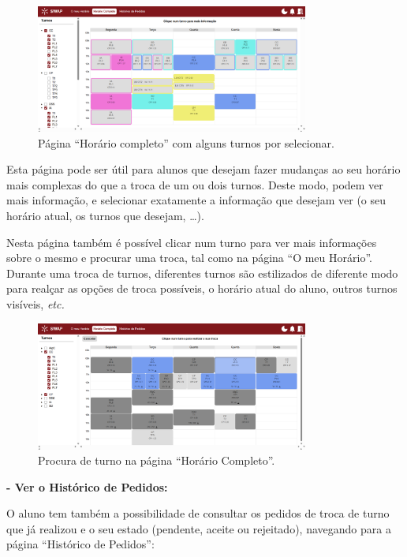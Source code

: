 \documentclass[12pt, a4paper]{article}
\begin{document}
\begin{figure}[H]
    \centering
    \includegraphics[width=0.8\textwidth]{res/manual/horario_completo_filtrado.png}
    \caption{Página ``Horário completo'' com alguns turnos por selecionar.}
    \label{horario_completo_filtrado}
\end{figure}

Esta página pode ser útil para alunos que desejam fazer mudanças ao seu horário mais complexas do
que a troca de um ou dois turnos. Deste modo, podem ver mais informação, e selecionar exatamente a
informação que desejam ver (o seu horário atual, os turnos que desejam, \ldots).

Nesta página também é possível clicar num turno para ver mais informações sobre o mesmo e procurar
uma troca, tal como na página ``O meu Horário''. Durante uma troca de turnos, diferentes turnos
são estilizados de diferente modo para realçar as opções de troca possíveis, o horário atual do
aluno, outros turnos visíveis, \emph{etc.}

\begin{figure}[H]
    \centering
    \includegraphics[width=0.8\textwidth]{res/manual/procura_troca_horario_completo.png}
    \caption{Procura de turno na página ``Horário Completo''.}
    \label{procura_troca_horario_completo}
\end{figure}

\textbf{- Ver o Histórico de Pedidos:}

O aluno tem também a possibilidade de consultar os pedidos de troca de turno que já realizou e o seu
estado (pendente, aceite ou rejeitado), navegando para a página ``Histórico de Pedidos'':
\end{document}
